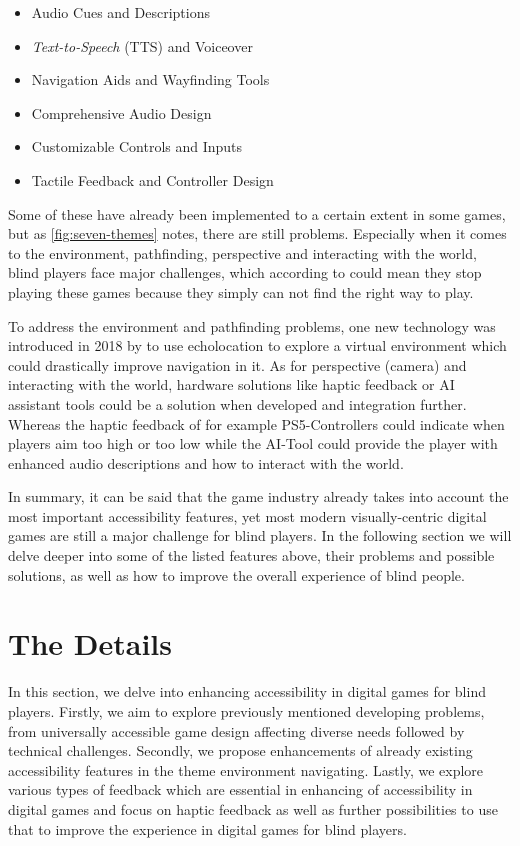 \documentclass[sigconf,natbib=false,10pt]{acmart}
\begin{document}
	\begin{itemize}
		\setlength\itemsep{0.5em}
		\item Audio Cues and Descriptions
		\item \emph{Text-to-Speech} (TTS) and Voiceover
		\item Navigation Aids and Wayfinding Tools
		\item Comprehensive Audio Design
		\item Customizable Controls and Inputs
		\item Tactile Feedback and Controller Design
	\end{itemize}
    
    Some of these have already been implemented to a certain extent in some games, but as \autoref{fig:seven-themes} notes, there are still problems.
    Especially when it comes to the environment, pathfinding, perspective and interacting with the world, blind players face major challenges, which according to \textcite{goncalves_my_2023} could mean they stop playing these games because they simply can not find the right way to play.
    
    To address the environment and pathfinding problems, one new technology was introduced in 2018 by \textcite{andrade_echo-house_2018} to use echolocation to explore a virtual environment which could drastically improve navigation in it.
    As for perspective (camera) and interacting with the world, hardware solutions like haptic feedback or AI assistant tools could be a solution when developed and integration further.
    Whereas the haptic feedback \cite{bello_haptics_2016} of for example PS5-Controllers \cite{akyaman_anticipated_2021, chen_gamepad_2024} could indicate when players aim too high or too low while the AI-Tool could provide the player with enhanced audio descriptions and how to interact with the world.
    
    In summary, it can be said that the game industry already takes into account the most important accessibility features, yet most modern visually-centric digital games are still a major challenge for blind players.
    In the following section we will delve deeper into some of the listed features above, their problems and possible solutions, as well as how to improve the overall experience of blind people.
	
	\section{The Details}
	In this section, we delve into enhancing accessibility in digital games for blind players.
	Firstly, we aim to explore previously mentioned developing problems, from universally accessible game design affecting diverse needs followed by technical challenges.
	Secondly, we propose enhancements of already existing accessibility features in the theme environment navigating.
	Lastly, we explore various types of feedback which are essential in enhancing of accessibility in digital games and focus on haptic feedback as well as further possibilities to use that to improve the experience in digital games for blind players.
	
\end{document}

